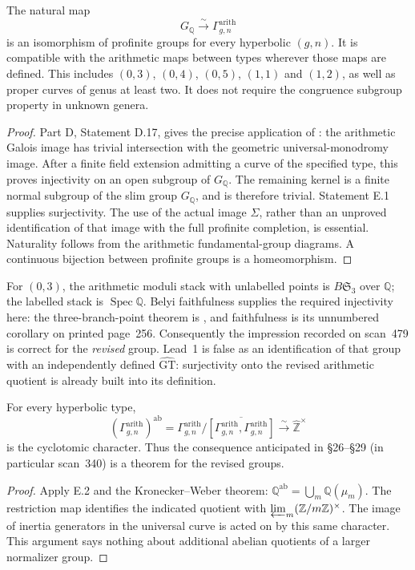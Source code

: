 The natural map
\[
 G_{\mathbb Q}\xrightarrow{\ \sim\ }\Gamma^{\mathrm{arith}}_{g,n}
\]
is an isomorphism of profinite groups for every hyperbolic $(g,n)$.
It is compatible with the arithmetic maps between types wherever those
maps are defined.  This includes $(0,3)$, $(0,4)$, $(0,5)$, $(1,1)$ and
$(1,2)$, as well as proper curves of genus at least two.  It does not require
the congruence subgroup property in unknown genera.
\begin{proof}
Part D, Statement D.17, gives the precise application of
\citet[Corollary~6.4]{HoshiMochizuki2011}: the arithmetic Galois image
has trivial intersection with the geometric universal-monodromy image.
After a finite field extension admitting a curve of the specified type,
this proves injectivity on an open subgroup of $G_{\mathbb Q}$.  The remaining
kernel is a finite normal subgroup of the slim group $G_{\mathbb Q}$, and
is therefore trivial.  Statement E.1 supplies surjectivity.  The use of the
actual image $\Sigma$, rather than an unproved identification of that image
with the full profinite completion, is essential.  Naturality follows from
the arithmetic fundamental-group diagrams.  A continuous bijection between
profinite groups is a homeomorphism.
\end{proof}

For $(0,3)$, the arithmetic moduli stack with unlabelled points is
$B\mathfrak S_3$ over $\mathbb Q$; the labelled stack is $\operatorname{Spec}
\mathbb Q$.  Belyi faithfulness supplies the required injectivity here:
the three-branch-point theorem is \citet[\S4, Theorem~4]{Belyi1980},
and faithfulness is its unnumbered corollary on printed page~256.
Consequently the impression recorded on scan~479 is correct for the
\emph{revised} group.  Lead~1 is false as an identification of that group
with an independently defined $\widehat{\mathrm{GT}}$: surjectivity onto
the revised arithmetic quotient is already built into its definition.

For every hyperbolic type,
\[
 (\Gamma^{\mathrm{arith}}_{g,n})^{\mathrm{ab}}
 =\Gamma^{\mathrm{arith}}_{g,n}/
   \overline{[\Gamma^{\mathrm{arith}}_{g,n},\Gamma^{\mathrm{arith}}_{g,n}]}
 \xrightarrow{\ \sim\ }\widehat{\mathbb Z}^{\times}
\]
is the cyclotomic character.  Thus the consequence anticipated in
\S26--\S29 (in particular scan~340) is a theorem for the revised groups.
\begin{proof}
Apply E.2 and the Kronecker--Weber theorem:
$\mathbb Q^{\mathrm{ab}}=\bigcup_m\mathbb Q(\mu_m)$.
The restriction map identifies the indicated quotient with
$\varprojlim_m(\mathbb Z/m\mathbb Z)^{\times}$.  The image of inertia
generators in the universal curve is acted on by this same character.
This argument says nothing about additional abelian quotients of a larger
normalizer group.
\end{proof}

